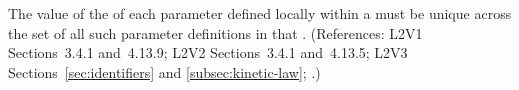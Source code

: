 The value of the   of each parameter defined locally within
a \KineticLaw must be unique across the set of all such parameter
definitions in that \KineticLaw.  (References: L2V1 Sections~3.4.1 and~4.13.9;
L2V2 Sections~3.4.1 and~4.13.5;
L2V3 Sections~\ref{sec:identifiers} and \ref{subsec:kinetic-law}; .)
